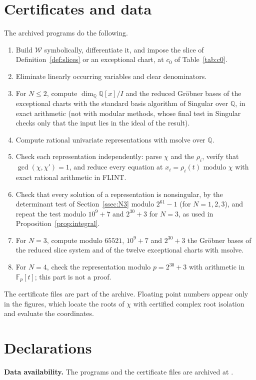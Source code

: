 \documentclass[11pt]{amsart}
\theoremstyle{definition}
\newcommand{\QQ}{\mathbb{Q}}
\newcommand{\cW}{\mathcal W}
\begin{document}
\section{Certificates and data}\label{app:cert}
The archived programs \cite{Bha26} do the following.
\begin{enumerate}
\item Build $\cW$ symbolically, differentiate it, and impose the slice of Definition~\ref{def:slices} or an exceptional chart, at $c_0$ of Table~\ref{tab:c0}.
\item Eliminate linearly occurring variables and clear denominators.
\item For $N\le2$, compute $\dim_\QQ\QQ[x]/I$ and the reduced Gröbner bases of the exceptional charts with the standard basis algorithm of Singular over $\QQ$, in exact arithmetic (not with modular methods, whose final test in Singular checks only that the input lies in the ideal of the result).
\item Compute rational univariate representations with msolve over $\QQ$.
\item Check each representation independently: parse $\chi$ and the $\rho_i$, verify that $\gcd(\chi,\chi')=1$, and reduce every equation at $x_i=\rho_i(t)$ modulo $\chi$ with exact rational arithmetic in FLINT.
\item Check that every solution of a representation is nonsingular, by the determinant test of Section~\ref{ssec:N3} modulo $2^{61}-1$ (for $N=1,2,3$), and repeat the test modulo $10^9+7$ and $2^{30}+3$ for $N=3$, as used in Proposition~\ref{prop:integral}.
\item For $N=3$, compute modulo $65521$, $10^9+7$ and $2^{30}+3$ the Gröbner bases of the reduced slice system and of the twelve exceptional charts with msolve.
\item For $N=4$, check the representation modulo $p=2^{30}+3$ with arithmetic in $\mathbb F_p[t]$; this part is not a proof.
\end{enumerate}
The certificate files are part of the archive. Floating point numbers appear only in the figures, which locate the roots of $\chi$ with certified complex root isolation and evaluate the coordinates.

\section*{Declarations}

\noindent\textbf{Data availability.} The programs and the certificate files are archived at \cite{Bha26}.
\end{document}
